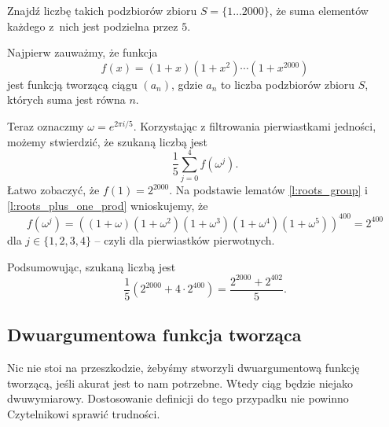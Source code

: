 \documentclass{scrartcl}
\begin{document}
    \begin{example}
        Znajdź liczbę takich podzbiorów zbioru $S = \{1\ldots 2000\}$, że suma elementów każdego z~nich jest podzielna przez $5$.
    \end{example}
    \begin{solution}
        Najpierw zauważmy, że funkcja
        $$ f(x) = (1 + x)(1 + x^2)\cdots(1 + x^{2000}) $$
        jest funkcją tworzącą ciągu $(a_n)$, gdzie $a_n$ to liczba podzbiorów zbioru $S$, których suma jest równa $n$.

        Teraz oznaczmy $\omega = e^{2\pi i / 5}$. Korzystając z filtrowania pierwiastkami jedności, możemy stwierdzić, że szukaną liczbą jest
        $$ \frac{1}{5}\sum_{j=0}^4 f(\omega^j). $$
        Łatwo zobaczyć, że $f(1) = 2^{2000}$. Na podstawie lematów \ref{l:roots_group} i \ref{l:roots_plus_one_prod} wnioskujemy, że
        $$ f(\omega^j) = \left((1 + \omega)(1 + \omega^2)(1 + \omega^3)(1 + \omega^4)(1 + \omega^5)\right)^{400} = 2^{400} $$
        dla $j \in \{1, 2, 3, 4\}$ -- czyli dla pierwiastków pierwotnych.

        Podsumowując, szukaną liczbą jest
        $$ \frac{1}{5}\left(2^{2000} + 4\cdot 2^{400}\right) = \frac{2^{2000} + 2^{402}}{5}. $$
    \end{solution}

    \subsection{Dwuargumentowa funkcja tworząca}
    Nic nie stoi na przeszkodzie, żebyśmy stworzyli dwuargumentową funkcję tworzącą, jeśli akurat jest to nam potrzebne. Wtedy ciąg będzie niejako dwuwymiarowy. Dostosowanie definicji do tego przypadku nie powinno Czytelnikowi sprawić trudności.
\end{document}
